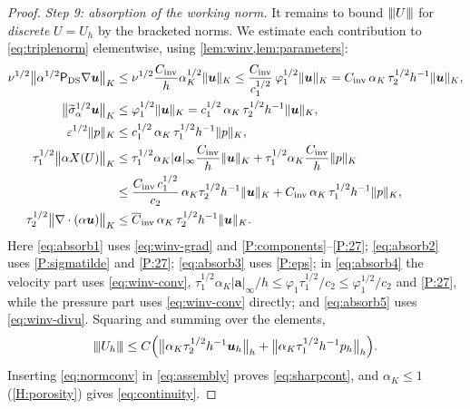 \documentclass[11pt,a4paper]{article}
\newcommand{\bu}{\boldsymbol{u}}
\newcommand{\ba}{\boldsymbol{a}}
\newcommand{\buh}{\boldsymbol{u}_h}
\newcommand{\ViscProj}{\mathsf{P}_{\mathrm{DS}}}
\newcommand{\X}{X}
\newcommand{\Cinv}{C_{\mathrm{inv}}}
\newcommand{\Cinva}{\overline{C}_{\mathrm{inv}}}
\DeclarePairedDelimiter{\norm}{\lVert}{\rVert}
\newcommand{\triplenorm}[1]{{\lvert\kern-0.25ex\lvert\kern-0.25ex\lvert #1
\rvert\kern-0.25ex\rvert\kern-0.25ex\rvert}}
\newcommand{\sigmatilde}{\widetilde{\sigma}_{\alpha}}
\theoremstyle{plain}
\theoremstyle{remark}
\theoremstyle{definition}
\numberwithin{equation}{section}
\begin{document}
\begin{proof}
\medskip\noindent\emph{Step 9: absorption of the working norm.}
It remains to bound $\triplenorm{U}$ for \emph{discrete} $U=U_h$ by the bracketed norms.
We estimate each contribution to \eqref{eq:triplenorm} elementwise, using
\cref{lem:winv,lem:parameters}:
\begin{align}
  \nu^{1/2}\bigl\lVert\alpha^{1/2}\ViscProj\nabla\bu\bigr\rVert_K
  &\le \nu^{1/2}\frac{\Cinv}{h}\alpha_K^{1/2}\norm{\bu}_K
  \le \frac{\Cinv}{c_1^{1/2}}\,\varphi_1^{1/2}\norm{\bu}_K
  = \Cinv\,\alpha_K\,\tau_2^{1/2}h^{-1}\norm{\bu}_K,
  \label{eq:absorb1}\\
  \bigl\lVert\sigmatilde^{1/2}\bu\bigr\rVert_K
  &\le \varphi_1^{1/2}\norm{\bu}_K
  = c_1^{1/2}\,\alpha_K\,\tau_2^{1/2}h^{-1}\norm{\bu}_K,
  \label{eq:absorb2}\\
  \varepsilon^{1/2}\norm{p}_K
  &\le c_1^{1/2}\,\alpha_K\,\tau_1^{1/2}h^{-1}\norm{p}_K,
  \label{eq:absorb3}\\
  \tau_1^{1/2}\bigl\lVert\alpha\X(U)\bigr\rVert_K
  &\le \tau_1^{1/2}\alpha_K|\ba|_\infty\frac{\Cinv}{h}\norm{\bu}_K
   + \tau_1^{1/2}\alpha_K\frac{\Cinv}{h}\norm{p}_K \nonumber\\
  &\le \frac{\Cinv\,c_1^{1/2}}{c_2}\,\alpha_K\tau_2^{1/2}h^{-1}\norm{\bu}_K
   + \Cinv\,\alpha_K\,\tau_1^{1/2}h^{-1}\norm{p}_K,
  \label{eq:absorb4}\\
  \tau_2^{1/2}\bigl\lVert\nabla\cdot(\alpha\bu)\bigr\rVert_K
  &\le \Cinva\,\alpha_K\,\tau_2^{1/2}h^{-1}\norm{\bu}_K .
  \label{eq:absorb5}
\end{align}
Here \eqref{eq:absorb1} uses \eqref{eq:winv-grad} and
\ref{P:components}--\ref{P:27}; \eqref{eq:absorb2} uses
\ref{P:sigmatilde} and \ref{P:27}; \eqref{eq:absorb3} uses \ref{P:eps};
in \eqref{eq:absorb4} the velocity part uses \eqref{eq:winv-conv},
$\tau_1^{1/2}\alpha_K|\ba|_\infty/h \le \varphi_1\tau_1^{1/2}/c_2
\le\varphi_1^{1/2}/c_2$ and \ref{P:27}, while the pressure part uses
\eqref{eq:winv-conv} directly; and \eqref{eq:absorb5} uses \eqref{eq:winv-divu}. Squaring
and summing over the elements,
\begin{equation}\label{eq:normconv}
  \triplenorm{U_h}
  \le C\Bigl(
  \bigl\lVert\alpha_K\tau_2^{1/2}h^{-1}\buh\bigr\rVert_h
  + \bigl\lVert\alpha_K\tau_1^{1/2}h^{-1}p_h\bigr\rVert_h\Bigr).
\end{equation}
Inserting \eqref{eq:normconv} in \eqref{eq:assembly} proves \eqref{eq:sharpcont}, and
$\alpha_K\le1$ (\cref{H:porosity}) gives \eqref{eq:continuity}.
\end{proof}
\end{document}
